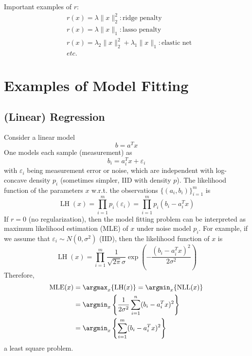 Important examples of $r$:
\begin{align*}
    & r(x) = \lambda \lVert x \rVert_2^2: \text{ridge penalty} \\
    & r(x) = \lambda \lVert x \rVert_1: \text{lasso penalty} \\
    & r(x) = \lambda_2 \lVert x \rVert_2^2 + \lambda_1 \lVert x \rVert_1: \text{elastic net} \\
    & etc.
\end{align*}

\section{Examples of Model Fitting}

\subsection{(Linear) Regression}

Consider a linear model
$$b = a^Tx$$
One models each sample (measurement) as
$$b_i = a_i^Tx + \varepsilon_i$$
with $\varepsilon_i$ being measurement error or noise, which are independent with log-concave density $p_i$ (sometimes simpler, IID with density $p$). The likelihood function of the parameters $x$ w.r.t. the observations $\{(a_i,b_i)\}_{i=1}^m$ is
$$\operatorname{LH}(x) = \prod\limits_{i=1}^m p_i(\varepsilon_i) = \prod\limits_{i=1}^m p_i(b_i - a_i^Tx)$$
If $r = 0$ (no regularization), then the model fitting problem can be interpreted as maximum likelihood estimation (MLE) of $x$ under noise model $p_i$. For example, if we assume that $\varepsilon_i \sim N(0, \sigma^2)$ (IID), then the likelihood function of $x$ is
$$\operatorname{LH}(x) = \prod\limits_{i=1}^m \dfrac{1}{\sqrt{2\pi}\sigma} \exp\left(-\frac{(b_i-a_i^Tx)^2}{2\sigma^2}\right)$$
Therefore,
\begin{align*}
    \operatorname{MLE}(x) & = \argmax_x \{\operatorname{LH}(x)\} = \argmin_x \{\operatorname{NLL}(x)\} \\
    & = \argmin_x \left\{ \dfrac{1}{2\sigma^2} \sum\limits_{i=1}^n (b_i-a_i^Tx)^2 \right\} \\
    & = \argmin_x \left\{ \sum\limits_{i=1}^m (b_i-a_i^Tx)^2 \right\}
\end{align*}
a least square problem.

